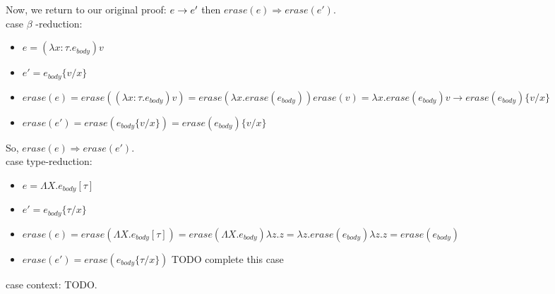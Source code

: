 \documentclass[10pt]{article}
\begin{document}
\begin{exercise}
Now, we return to our original proof: $e \rightarrow e'$ then
$\mathit{erase}(e) \Rightarrow \mathit{erase}(e')$.\\

{\sc case} $\beta$ {\sc -reduction}:\\
\begin{itemize}

\item $e = (\lambda x: \tau. e_{body}) v$

\item $e' = e_{body}\{v/x\}$

\item $\mathit{erase}(e) = \mathit{erase}((\lambda x:\tau. e_{body}) v) = \mathit{erase}(\lambda x.\mathit{erase}(e_{body})) \mathit{erase}(v) = \lambda x.\mathit{erase}(e_{body}) v \rightarrow \mathit{erase}(e_{body})\{v/x\}$

\item $\mathit{erase}(e') = \mathit{erase}(e_{body} \{v/x\}) = \mathit{erase}(e_{body})\{v/x\}$\\

\end{itemize}

So, $\mathit{erase}(e) \Rightarrow \mathit{erase}(e').$ \checkmark \\

{\sc case type-reduction}:

\begin{itemize}
\item $e = \Lambda X. e_{body} [\tau]$
\item $e' = e_{body} \{\tau / x\}$
\item $\mathit{erase}(e) = \mathit{erase}(\Lambda X. e_{body}[\tau]) = \mathit{erase}(\Lambda X. e_{body}) \lambda z.z = \lambda z.\mathit{erase}(e_{body}) \lambda z. z = \mathit{erase}(e_{body})$
\item $\mathit{erase}(e') = \mathit{erase}(e_{body} \{\tau/x\})$ TODO complete this case
\end{itemize}


{\sc case context}: TODO.\\


  

\end{exercise}
\end{document}
